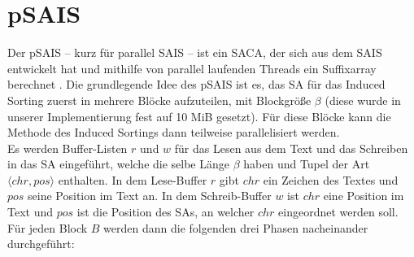\section{pSAIS}
\label{section:psais}


Der pSAIS -- kurz für parallel SAIS -- ist ein SACA, der sich aus dem SAIS entwickelt hat und mithilfe von parallel laufenden Threads ein Suffixarray berechnet \cite{psais}. Die grundlegende Idee des pSAIS ist es, das SA für das Induced Sorting zuerst in mehrere Blöcke aufzuteilen, mit Blockgröße $\beta$ (diese wurde in unserer Implementierung fest auf 10 MiB gesetzt). Für diese Blöcke kann die Methode des Induced Sortings dann teilweise parallelisiert werden.\\
Es werden Buffer-Listen $r$ und $w$ für das Lesen aus dem Text und das Schreiben in das SA  eingeführt, welche die selbe Länge $\beta$ haben und Tupel der Art $\langle chr, pos \rangle$ enthalten. In dem Lese-Buffer $r$ gibt $chr$ ein Zeichen des Textes und $pos$ seine Position im Text an. In dem Schreib-Buffer $w$ ist $chr$ eine Position im Text und $pos$ ist die Position des SAs, an welcher $chr$ eingeordnet werden soll. Für jeden Block $B$ werden dann die folgenden drei Phasen nacheinander durchgeführt:

